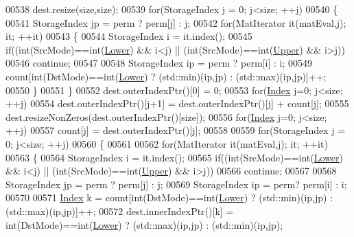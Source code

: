 \begin{DoxyCode}
00538   dest.resize(size,size);
00539   \textcolor{keywordflow}{for}(StorageIndex j = 0; j<size; ++j)
00540   \{
00541     StorageIndex jp = perm ? perm[j] : j;
00542     \textcolor{keywordflow}{for}(MatIterator it(matEval,j); it; ++it)
00543     \{
00544       StorageIndex i = it.index();
00545       \textcolor{keywordflow}{if}((\textcolor{keywordtype}{int}(SrcMode)==\textcolor{keywordtype}{int}(\hyperlink{group__enums_gga39e3366ff5554d731e7dc8bb642f83cda891792b8ed394f7607ab16dd716f60e6}{Lower}) && i<j) || (\textcolor{keywordtype}{int}(SrcMode)==\textcolor{keywordtype}{int}(\hyperlink{group__enums_gga39e3366ff5554d731e7dc8bb642f83cda6bcb58be3b8b8ec84859ce0c5ac0aaec}{Upper}) && i>j))
00546         \textcolor{keywordflow}{continue};
00547                   
00548       StorageIndex ip = perm ? perm[i] : i;
00549       count[int(DstMode)==int(\hyperlink{group__enums_gga39e3366ff5554d731e7dc8bb642f83cda891792b8ed394f7607ab16dd716f60e6}{Lower}) ? (std::min)(ip,jp) : (std::max)(ip,jp)]++;
00550     \}
00551   \}
00552   dest.outerIndexPtr()[0] = 0;
00553   \textcolor{keywordflow}{for}(\hyperlink{group___core___module_a554f30542cc2316add4b1ea0a492ff02}{Index} j=0; j<size; ++j)
00554     dest.outerIndexPtr()[j+1] = dest.outerIndexPtr()[j] + count[j];
00555   dest.resizeNonZeros(dest.outerIndexPtr()[size]);
00556   \textcolor{keywordflow}{for}(\hyperlink{group___core___module_a554f30542cc2316add4b1ea0a492ff02}{Index} j=0; j<size; ++j)
00557     count[j] = dest.outerIndexPtr()[j];
00558   
00559   \textcolor{keywordflow}{for}(StorageIndex j = 0; j<size; ++j)
00560   \{
00561     
00562     \textcolor{keywordflow}{for}(MatIterator it(matEval,j); it; ++it)
00563     \{
00564       StorageIndex i = it.index();
00565       \textcolor{keywordflow}{if}((\textcolor{keywordtype}{int}(SrcMode)==\textcolor{keywordtype}{int}(\hyperlink{group__enums_gga39e3366ff5554d731e7dc8bb642f83cda891792b8ed394f7607ab16dd716f60e6}{Lower}) && i<j) || (\textcolor{keywordtype}{int}(SrcMode)==\textcolor{keywordtype}{int}(\hyperlink{group__enums_gga39e3366ff5554d731e7dc8bb642f83cda6bcb58be3b8b8ec84859ce0c5ac0aaec}{Upper}) && i>j))
00566         \textcolor{keywordflow}{continue};
00567                   
00568       StorageIndex jp = perm ? perm[j] : j;
00569       StorageIndex ip = perm? perm[i] : i;
00570       
00571       \hyperlink{group___core___module_a554f30542cc2316add4b1ea0a492ff02}{Index} k = count[int(DstMode)==int(\hyperlink{group__enums_gga39e3366ff5554d731e7dc8bb642f83cda891792b8ed394f7607ab16dd716f60e6}{Lower}) ? (std::min)(ip,jp) : (std::max)(ip,jp)]++;
00572       dest.innerIndexPtr()[k] = int(DstMode)==int(\hyperlink{group__enums_gga39e3366ff5554d731e7dc8bb642f83cda891792b8ed394f7607ab16dd716f60e6}{Lower}) ? (std::max)(ip,jp) : (std::min)(ip,jp);

\end{DoxyCode}
